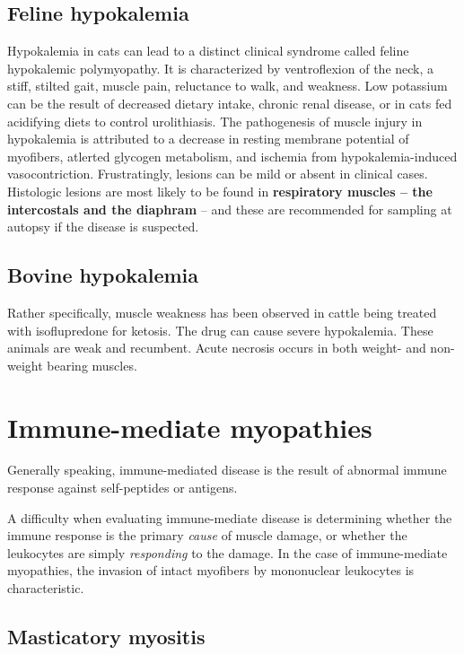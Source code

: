 \documentclass[openany]{book}
\begin{document}
\section{Feline hypokalemia}\label{feline-hypokalemia}

Hypokalemia in cats can lead to a distinct clinical syndrome called
feline hypokalemic polymyopathy. It is characterized by ventroflexion of
the neck, a stiff, stilted gait, muscle pain, reluctance to walk, and
weakness. Low potassium can be the result of decreased dietary intake,
chronic renal disease, or in cats fed acidifying diets to control
urolithiasis. The pathogenesis of muscle injury in hypokalemia is
attributed to a decrease in resting membrane potential of myofibers,
atlerted glycogen metabolism, and ischemia from hypokalemia-induced
vasocontriction. Frustratingly, lesions can be mild or absent in
clinical cases. Histologic lesions are most likely to be found in
\textbf{respiratory muscles -- the intercostals and the diaphram } --
and these are recommended for sampling at autopsy if the disease is
suspected.

\section{Bovine hypokalemia}\label{bovine-hypokalemia}

Rather specifically, muscle weakness has been observed in cattle being
treated with isoflupredone for ketosis. The drug can cause severe
hypokalemia. These animals are weak and recumbent. Acute necrosis occurs
in both weight- and non-weight bearing muscles.

\chapter{Immune-mediate myopathies}\label{immune-mediate-myopathies}

Generally speaking, immune-mediated disease is the result of abnormal
immune response against self-peptides or antigens.

A difficulty when evaluating immune-mediate disease is determining
whether the immune response is the primary \emph{cause} of muscle
damage, or whether the leukocytes are simply \emph{responding} to the
damage. In the case of immune-mediate myopathies, the invasion of intact
myofibers by mononuclear leukocytes is characteristic.

\section{Masticatory myositis}\label{masticatory-myositis}
\end{document}

